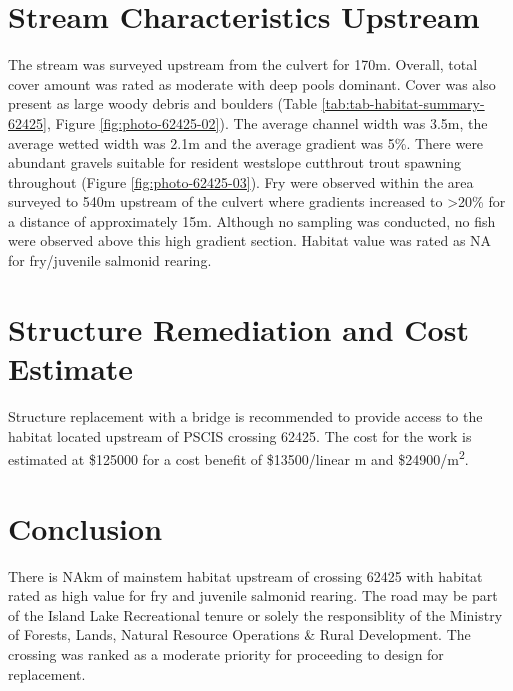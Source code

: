 \documentclass[
]{book}
\begin{document}
\hypertarget{stream-characteristics-upstream-4}{%
\section*{Stream Characteristics Upstream}\label{stream-characteristics-upstream-4}}

The stream was surveyed upstream from the culvert for 170m. Overall, total cover amount was rated as moderate with deep pools dominant. Cover was also present as large woody debris and boulders (Table \ref{tab:tab-habitat-summary-62425}, Figure \ref{fig:photo-62425-02}). The average channel width was 3.5m, the average wetted width was 2.1m and the average gradient was 5\%. There were abundant gravels suitable for resident westslope cutthrout trout spawning throughout (Figure \ref{fig:photo-62425-03}). Fry were observed within the area surveyed to 540m upstream of the culvert where gradients increased to \textgreater20\% for a distance of approximately 15m. Although no sampling was conducted, no fish were observed above this high gradient section. Habitat value was rated as NA for fry/juvenile salmonid rearing.

\hypertarget{structure-remediation-and-cost-estimate-4}{%
\section*{Structure Remediation and Cost Estimate}\label{structure-remediation-and-cost-estimate-4}}

Structure replacement with a bridge is recommended to provide access to the habitat located upstream of PSCIS crossing 62425. The cost for the work is estimated at \$125000 for a cost benefit of \$13500/linear m and \$24900/m\textsuperscript{2}.

\hypertarget{conclusion-5}{%
\section*{Conclusion}\label{conclusion-5}}

There is NAkm of mainstem habitat upstream of crossing 62425 with habitat rated as high value for fry and juvenile salmonid rearing. The road may be part of the Island Lake Recreational tenure or solely the responsiblity of the Ministry of Forests, Lands, Natural Resource Operations \& Rural Development. The crossing was ranked as a moderate priority for proceeding to design for replacement.
\end{document}
